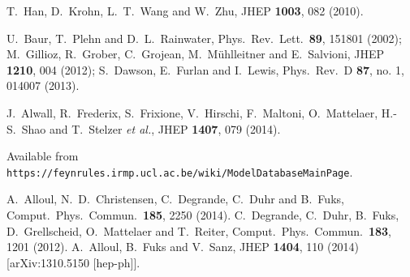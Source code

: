   T.~Han, D.~Krohn, L.~T.~Wang and W.~Zhu,
  JHEP {\bf 1003}, 082 (2010).

  U.~Baur, T.~Plehn and D.~L.~Rainwater,
  Phys.\ Rev.\ Lett.\  {\bf 89}, 151801 (2002); 
  M.~Gillioz, R.~Grober, C.~Grojean, M.~M\"uhlleitner and E.~Salvioni,
  JHEP {\bf 1210}, 004 (2012);
  S.~Dawson, E.~Furlan and I.~Lewis,
  Phys.\ Rev.\ D {\bf 87}, no. 1, 014007 (2013).
  
  J.~Alwall, R.~Frederix, S.~Frixione, V.~Hirschi, F.~Maltoni, O.~Mattelaer, H.-S.~Shao and T.~Stelzer {\it et al.},
  JHEP {\bf 1407}, 079 (2014).

 Available from \texttt{https://feynrules.irmp.ucl.ac.be/wiki/ModelDatabaseMainPage}.

  A.~Alloul, N.~D.~Christensen, C.~Degrande, C.~Duhr and B.~Fuks,
  Comput.\ Phys.\ Commun.\  {\bf 185}, 2250 (2014).
  C.~Degrande, C.~Duhr, B.~Fuks, D.~Grellscheid, O.~Mattelaer and T.~Reiter,
  Comput.\ Phys.\ Commun.\  {\bf 183}, 1201 (2012).
  A.~Alloul, B.~Fuks and V.~Sanz,
  JHEP {\bf 1404}, 110 (2014)
  [arXiv:1310.5150 [hep-ph]].
 
